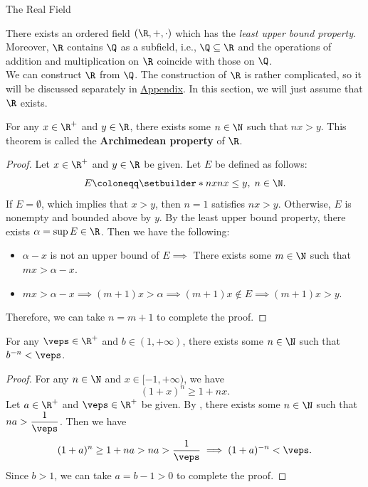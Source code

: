 \begin{section}{The Real Field}

There exists an ordered field $(\R, +, \cdot)$ which has the
\emph{least upper bound property}. Moreover, $\R$ contains $\Q$ as a subfield, i.e.,
$\Q \subseteq \R$ and the operations of addition and multiplication on $\R$ coincide with those on $\Q$.
\\[6mm]
We can construct $\R$ from $\Q$. The construction of $\R$ is rather complicated, so it will be discussed
separately in \hyperref[chap:ConstructionOfR]{Appendix}. In this section, we will just assume that $\R$ exists.

\bigskip

\begin{theorem} \label{thm:ArchimedeanProperty}
    For any $x\in \R^{+}$ and $y \in \R$, there exists some $n \in \N$ such that $nx > y$.
    This theorem is called the \textbf{Archimedean property} of $\R$.
\end{theorem}

\begin{proof}
    Let $x \in \R^{+}$ and $y \in \R$ be given. Let $E$ be defined as follows:
    \[
    E \coloneqq \setbuilder*{nx}{nx \leq y, \; n \in \N}.
    \]
    If $E = \emptyset$, which implies that $x > y$, then $n = 1$ satisfies $nx > y$. Otherwise, $E$ is nonempty and bounded
    above by $y$. By the least upper bound property, there exists $\alpha = \sup E \in \R$. Then we have the following:
    \begin{itemize}
        \item $\alpha - x$ is not an upper bound of $E \implies$ There exists some $m \in \N$ such that $mx > \alpha - x$.
        \item $mx > \alpha - x \implies (m + 1)x > \alpha \implies (m + 1)x \notin E \implies (m + 1)x > y$.
    \end{itemize}
    Therefore, we can take $n = m + 1$ to complete the proof.
\end{proof}

\bigskip

\begin{corollary} \label{cor:ArchimedeanPropertyCorollary}
    For any $\veps \in \R^{+}$ and $b \in (1, + \infty)$, there exists some $n \in \N$ such that $b^{-n} < \veps$.
\end{corollary}

\begin{proof}
    For any $n \in \N$ and $x \in [-1, + \infty)$, we have
    \[
    (1 + x)^{n} \geq 1 + nx.
    \]
    Let $a \in \R^{+}$ and $\veps \in \R^{+}$ be given. By ,
    there exists some $n \in \N$ such that $na > \dfrac{1}{\veps}$. Then we have
    \[
    (1 + a)^{n} \geq 1 + na > na > \frac{1}{\veps} \implies (1 + a)^{-n} < \veps.
    \]
    Since $b > 1$, we can take $a = b - 1 > 0$ to complete the proof.
\end{proof}


\end{section}
